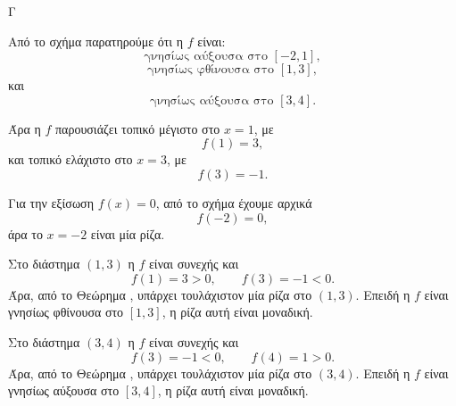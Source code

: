 

\begin{thema}{Γ}

\begin{center}
\end{center}

\begin{erwthma}
\item Από το σχήμα παρατηρούμε ότι η $f$ είναι:
\[
\text{γνησίως αύξουσα στο }[-2,1],
\]
\[
\text{γνησίως φθίνουσα στο }[1,3],
\]
και
\[
\text{γνησίως αύξουσα στο }[3,4].
\]

Άρα η $f$ παρουσιάζει τοπικό μέγιστο στο $x=1$, με
\[
f(1)=3,
\]
και τοπικό ελάχιστο στο $x=3$, με
\[
f(3)=-1.
\]

Για την εξίσωση $f(x)=0$, από το σχήμα έχουμε αρχικά
\[
f(-2)=0,
\]
άρα το $x=-2$ είναι μία ρίζα.

Στο διάστημα $(1,3)$ η $f$ είναι συνεχής και
\[
f(1)=3>0,\qquad f(3)=-1<0.
\]
Άρα, από το Θεώρημα , υπάρχει τουλάχιστον μία ρίζα στο $(1,3)$. Επειδή η $f$ είναι γνησίως φθίνουσα στο $[1,3]$, η ρίζα αυτή είναι μοναδική.

Στο διάστημα $(3,4)$ η $f$ είναι συνεχής και
\[
f(3)=-1<0,\qquad f(4)=1>0.
\]
Άρα, από το Θεώρημα , υπάρχει τουλάχιστον μία ρίζα στο $(3,4)$. Επειδή η $f$ είναι γνησίως αύξουσα στο $[3,4]$, η ρίζα αυτή είναι μοναδική.


\end{erwthma}
\end{thema}
